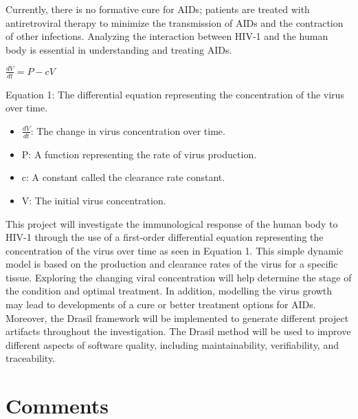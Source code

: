 \documentclass{article}
\begin{document}
Currently, there is no formative cure for AIDs; patients are treated with antiretroviral therapy to minimize the transmission of AIDs and the contraction of other infections. Analyzing the interaction between HIV-1 and the human body is essential in understanding and treating AIDs. 

\begin{center}
$\frac{dV}{dt}= P - cV$

Equation 1: The differential equation representing the concentration of the virus over time. 
\end{center}

\begin{itemize}
	\item $\frac{dV}{dt}$: The change in virus concentration over time. 
	\item P: A function representing the rate of virus production. 
	\item c: A constant called the clearance rate constant.
	\item V: The initial virus concentration.
\end{itemize}

This project will investigate the immunological response of the human body to HIV-1 through the use of a first-order differential equation representing the concentration of the virus over time as seen in Equation  1. This simple dynamic model is based on the production and clearance rates of the virus for a specific tissue.  Exploring the changing viral concentration will help determine the stage of the condition and optimal treatment. In addition, modelling the virus growth may lead to developments of a cure or better treatment options for AIDs. Moreover, the Drasil framework will be implemented to generate different project artifacts throughout the investigation. The Drasil method will be used to improve different aspects of software quality, including maintainability, verifiability, and traceability.


\newpage
\section{Comments}

\iffalse
\wss{comment}
\amc{comment}
\fi
\end{document}
